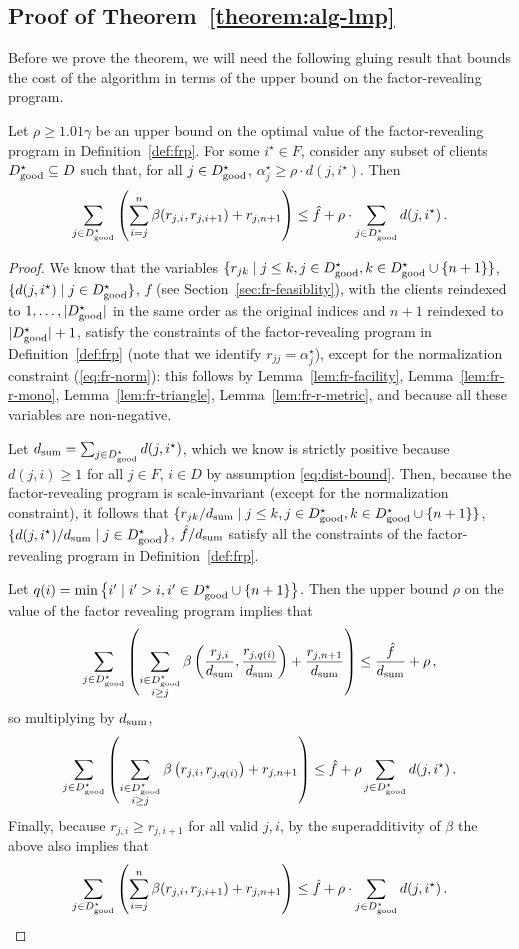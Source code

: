 \subsection{Proof of Theorem~\ref{theorem:alg-lmp}}
\label{subsec:lmp-proof}
Before we prove the theorem, we will need the following gluing result that bounds the cost of the algorithm in terms of the upper bound on the factor-revealing program.

\begin{lemma}
\label{lem:dgood-cost}
    Let $\rho \geq 1.01 \gamma$ be an upper bound on the optimal value of the factor-revealing program in Definition~\ref{def:frp}.
    For some $i^\star \in F$, consider any subset of clients $D^\star_{\mathrm{good}} \subseteq D$ such that, for all $j \in D^\star_{\mathrm{good}}$, $\alpha_j^\star \geq \rho \cdot d(j, i^\star)$.
    Then
    \[\sum_{j \in D^\star_{\mathrm{good}}} \left(\sum_{i=j}^n \beta(r_{j,i}, r_{j,i+1}) + r_{j,n+1}\right) \leq \hat{f} + \rho \cdot \sum_{j \in D^\star_{\mathrm{good}}} d(j, i^\star)\,.\]
\end{lemma}
\begin{proof}
We know that the variables $\{r_{jk} \mid j \leq k, j \in D^\star_{\mathrm{good}}, k \in D^\star_{\mathrm{good}} \cup \{n + 1\}\}$, $\{d(j, i^\star) \mid j \in D^\star_{\mathrm{good}}\}$, $\hat f$ (see Section~\ref{sec:fr-feasiblity}), with the clients reindexed to $1, \ldots, |D^\star_{\mathrm{good}}|$  in the same order as the original indices and $n+1$ reindexed to $|D^\star_{\mathrm{good}}|+1$, satisfy the constraints of the factor-revealing program in Definition~\ref{def:frp} (note that we identify $r_{jj} = \alpha^\star_j$), except for the normalization constraint (\ref{eq:fr-norm}): this follows by Lemma~\ref{lem:fr-facility}, Lemma~\ref{lem:fr-r-mono}, Lemma~\ref{lem:fr-triangle}, Lemma~\ref{lem:fr-r-metric}, and because all these variables are non-negative.

Let $d_{\mathrm{sum}} = \sum_{j \in D^\star_{\mathrm{good}}} d(j, i^\star)$, which we know is strictly positive because $d(j, i) \geq 1$ for all $j \in F$, $i \in D$ by assumption \eqref{eq:dist-bound}.
Then, because the factor-revealing program is scale-invariant (except for the normalization constraint), it follows that $\{r_{jk} / d_{\mathrm{sum}} \mid j \leq k, j \in D^\star_{\mathrm{good}}, k \in D^\star_{\mathrm{good}} \cup \{n + 1\}\}$, $\{d(j, i^\star) / d_{\mathrm{sum}} \mid j \in D^\star_{\mathrm{good}}\}$, $\hat f / d_{\mathrm{sum}}$ satisfy all the constraints of the factor-revealing program in Definition~\ref{def:frp}.

Let $q(i) = \min \left\{i' \mid i' > i, i' \in D^\star_{\mathrm{good}} \cup \{n+1\}\right\}$.
Then the upper bound $\rho$ on the value of the factor revealing program implies that
\[\sum_{j \in D^\star_{\mathrm{good}}} \left(\sum_{\substack{i \in D^\star_{\mathrm{good}}\\i \geq j}} \beta\left(\frac{r_{j,i}}{d_{\mathrm{sum}}}, \frac{r_{j,q(i)}}{d_{\mathrm{sum}}}\right) + \frac{r_{j,n+1}}{d_{\mathrm{sum}}} \right) \leq \frac{\hat{f}}{d_{\mathrm{sum}}} + \rho\,,\]
so multiplying by $d_{\mathrm{sum}}$, 
\[\sum_{j \in D^\star_{\mathrm{good}}} \left(\sum_{\substack{i \in D^\star_{\mathrm{good}}\\i \geq j}} \beta\left(r_{j,i}, r_{j,q(i)}\right) + r_{j,n+1}\right) \leq \hat{f} + \rho \sum_{j \in D^\star_{\mathrm{good}}} d(j, i^\star)\,.\]
Finally, because $r_{j,i} \geq r_{j,i+1}$ for all valid $j,i$, by the superadditivity of $\beta$ the above also implies that
\[\sum_{j \in D^\star_{\mathrm{good}}} \left(\sum_{i=j}^n \beta(r_{j,i}, r_{j,i+1}) + r_{j,n+1}\right) \leq \hat{f} + \rho \cdot \sum_{j \in D^\star_{\mathrm{good}}} d(j, i^\star)\,.\]
\end{proof}

